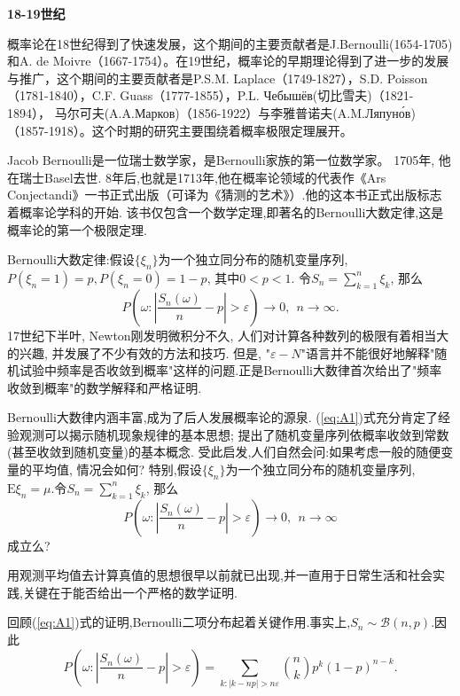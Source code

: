 \textbf{18-19世纪}

概率论在18世纪得到了快速发展，这个期间的主要贡献者是J.Bernoulli(1654-1705)和A. de Moivre（1667-1754）。在19世纪，概率论的早期理论得到了进一步的发展与推广，这个期间的主要贡献者是P.S.M. Laplace（1749-1827），S.D. Poisson（1781-1840），C.F. Guass（1777-1855），P.L. Чебышёв(切比雪夫)（1821-1894）， 马尔可夫(A.A.Марков)（1856-1922）与李雅普诺夫(A.M.Ляпуно́в)（1857-1918）。这个时期的研究主要围绕着概率极限定理展开。

Jacob Bernoulli是一位瑞士数学家，是Bernoulli家族的第一位数学家。 1705年, 他在瑞士Basel去世. 8年后,也就是1713年,他在概率论领域的代表作《Ars Conjectandi》一书正式出版（可译为《猜测的艺术》）.他的这本书正式出版标志着概率论学科的开始. 该书仅包含一个数学定理,即著名的Bernoulli大数定律,这是概率论的第一个极限定理.

Bernoulli大数定律:假设$\{\xi_n\}$为一个独立同分布的随机变量序列,$P(\xi_n = 1) = p, P(\xi_n = 0) = 1-p$, 其中$0<p<1$. 令$S_n = \sum_{k=1}^{n}\xi_k$, 那么
\begin{equation}\label{eq:A1}
P\left(\omega:\left|\frac{S_n(\omega)}{n}-p\right|>\varepsilon \right)\to 0,~~n\to\infty.
\end{equation}
17世纪下半叶, Newton刚发明微积分不久, 人们对计算各种数列的极限有着相当大的兴趣, 并发展了不少有效的方法和技巧. 但是, "$\varepsilon-N$"语言并不能很好地解释"随机试验中频率是否收敛到概率"这样的问题.正是Bernoulli大数律首次给出了"频率收敛到概率"的数学解释和严格证明.

Bernoulli大数律内涵丰富,成为了后人发展概率论的源泉. (\ref{eq:A1})式充分肯定了经验观测可以揭示随机现象规律的基本思想; 提出了随机变量序列依概率收敛到常数(甚至收敛到随机变量)的基本概念. 受此启发,人们自然会问:如果考虑一般的随便变量的平均值, 情况会如何? 特别,假设$\{\xi_n\}$为一个独立同分布的随机变量序列,$\mathrm{E}\xi_n = \mu$.令$S_n = \sum_{k=1}^{n}\xi_k$, 那么\begin{equation}\label{eq:A2}
P\left(\omega:\left|\frac{S_n(\omega)}{n}-p\right|>\varepsilon \right)\to 0,~~n\to\infty
\end{equation}成立么?

用观测平均值去计算真值的思想很早以前就已出现,并一直用于日常生活和社会实践,关键在于能否给出一个严格的数学证明.

回顾(\ref{eq:A1})式的证明,Bernoulli二项分布起着关键作用.事实上,$S_n\sim \mathcal{B}(n,p)$.因此
\begin{equation}\label{eq:A3}
P\left(\omega:\left|\frac{S_n(\omega)}{n}-p\right|>\varepsilon \right)	= \sum_{k:|k-np|>n\varepsilon}\binom{n}{k}p^k(1-p)^{n-k}.	
\end{equation}

